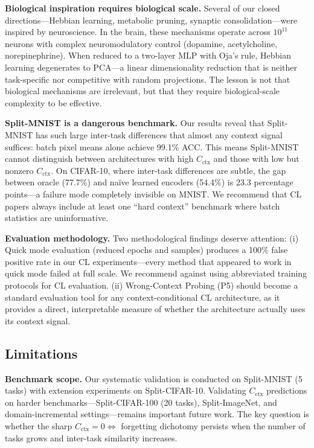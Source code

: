 \documentclass{article}
\begin{document}
\textbf{Biological inspiration requires biological scale.}
Several of our closed directions---Hebbian learning, metabolic pruning, synaptic consolidation---were inspired by neuroscience. In the brain, these mechanisms operate across $10^{11}$ neurons with complex neuromodulatory control (dopamine, acetylcholine, norepinephrine). When reduced to a two-layer MLP with Oja's rule, Hebbian learning degenerates to PCA---a linear dimensionality reduction that is neither task-specific nor competitive with random projections. The lesson is not that biological mechanisms are irrelevant, but that they require biological-scale complexity to be effective.

\textbf{Split-MNIST is a dangerous benchmark.}
Our results reveal that Split-MNIST has such large inter-task differences that almost any context signal suffices: batch pixel means alone achieve 99.1\% ACC. This means Split-MNIST cannot distinguish between architectures with high $C_\mathrm{ctx}$ and those with low but nonzero $C_\mathrm{ctx}$. On CIFAR-10, where inter-task differences are subtle, the gap between oracle (77.7\%) and na\"ive learned encoders (54.4\%) is 23.3 percentage points---a failure mode completely invisible on MNIST. We recommend that CL papers always include at least one ``hard context'' benchmark where batch statistics are uninformative.

\textbf{Evaluation methodology.}
Two methodological findings deserve attention: (i) Quick mode evaluation (reduced epochs and samples) produces a 100\% false positive rate in our CL experiments---every method that appeared to work in quick mode failed at full scale. We recommend against using abbreviated training protocols for CL evaluation. (ii) Wrong-Context Probing (P5) should become a standard evaluation tool for any context-conditional CL architecture, as it provides a direct, interpretable measure of whether the architecture actually uses its context signal.

\subsection{Limitations}
\label{sec:limitations}

\textbf{Benchmark scope.} Our systematic validation is conducted on Split-MNIST (5 tasks) with extension experiments on Split-CIFAR-10. Validating $C_\mathrm{ctx}$ predictions on harder benchmarks---Split-CIFAR-100 (20 tasks), Split-ImageNet, and domain-incremental settings---remains important future work. The key question is whether the sharp $C_\mathrm{ctx} = 0 \Leftrightarrow$ forgetting dichotomy persists when the number of tasks grows and inter-task similarity increases.
\end{document}
